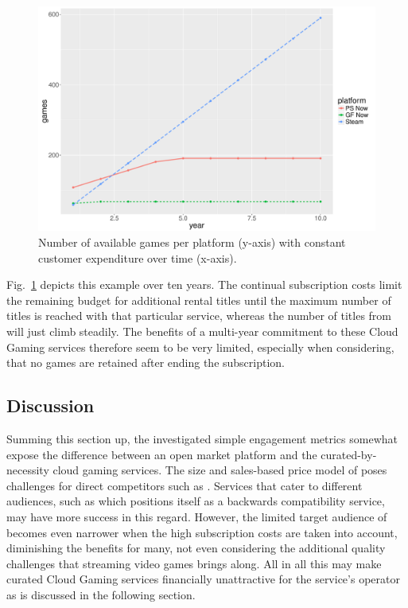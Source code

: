 \begin{figure}[!t]
	\centering
	\includegraphics[width=1.0\columnwidth]{images/games-over-year.pdf}
	\caption{Number of available games per platform (y-axis) with constant customer expenditure over time (x-axis).}
\label{fig:games-over-years}
\end{figure}

Fig.~\ref{fig:games-over-years} depicts this example over ten years. The continual subscription costs limit the remaining budget for additional rental titles until the maximum number of titles is reached with that particular service, whereas the number of titles from \steam will just climb steadily. The benefits of a multi-year commitment to these Cloud Gaming services therefore seem to be very limited, especially when considering, that no games are retained after ending the subscription.


\subsection{Discussion}

Summing this section up, the investigated simple engagement metrics somewhat expose the difference between an open market platform and the curated-by-necessity cloud gaming services. The size and sales-based price model of \steam poses challenges for direct competitors such as \gfnow. Services that cater to different audiences, such as \psnow which positions itself as a backwards compatibility service, may have more success in this regard. However, the limited target audience of \psnow becomes even narrower when the high subscription costs are taken into account, diminishing the benefits for many, not even considering the additional quality challenges that streaming video games brings along. All in all this may make curated Cloud Gaming services financially unattractive for the service's operator as is discussed in the following section.


